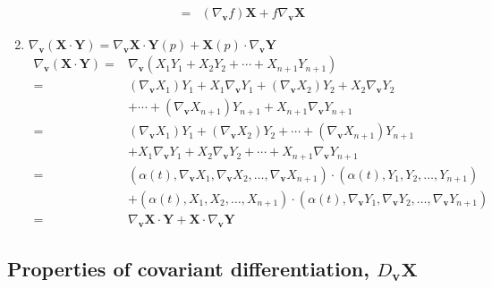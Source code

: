 \begin{enumerate}
\begin{align*}
		=& (\nabla_{\boldsymbol{v}} f)\boldsymbol{X} + f\nabla_{\boldsymbol{v}} \boldsymbol{X}
	\end{align*}
	\item $\nabla_{\boldsymbol{v}} (\boldsymbol{X} \cdot \boldsymbol{Y}) = \nabla_{\boldsymbol{v}} \boldsymbol{X} \cdot \boldsymbol{Y}(p) + \boldsymbol{X}(p) \cdot \nabla_{\boldsymbol{v}} \boldsymbol{Y} $
	\begin{align*}
		\nabla_{\boldsymbol{v}}(\boldsymbol{X} \cdot \boldsymbol{Y}) = & \nabla_{\boldsymbol{v}} (X_1Y_1 + X_2Y_2 + \dotsb + X_{n+1}Y_{n+1}) \\
		= & (\nabla_{\boldsymbol{v}} X_1)Y_1 + X_1\nabla_{\boldsymbol{v}} Y_1 + (\nabla_{\boldsymbol{v}} X_2) Y_2 + X_2\nabla_{\boldsymbol{v}} Y_2\\
		& + \dotsb + (\nabla_{\boldsymbol{v}} X_{n+1})Y_{n+1} + X_{n+1}\nabla_{\boldsymbol{v}} Y_{n+1}\\
		= & (\nabla_{\boldsymbol{v}} X_1)Y_1 + (\nabla_{\boldsymbol{v}} X_2)Y_2 + \dotsb + (\nabla_{\boldsymbol{v}} X_{n+1})Y_{n+1} \\
		& + X_1\nabla_{\boldsymbol{v}} Y_1 +X_2\nabla_{\boldsymbol{v}} Y_2 + \dotsb + X_{n+1} \nabla_{\boldsymbol{v}} Y_{n+1}\\
		= & (\alpha(t),\nabla_{\boldsymbol{v}} X_1,\nabla_{\boldsymbol{v}} X_2,\dots,\nabla_{\boldsymbol{v}} X_{n+1}) \cdot (\alpha(t),Y_1,Y_2,\dots,Y_{n+1})\\
		& + (\alpha(t),X_1,X_2,\dots,X_{n+1}) \cdot (\alpha(t),\nabla_{\boldsymbol{v}} Y_1,\nabla_{\boldsymbol{v}} Y_2,\dots,\nabla_{\boldsymbol{v}} Y_{n+1}) \\
		= & \nabla_{\boldsymbol{v}} \boldsymbol{X} \cdot \boldsymbol{Y} + \boldsymbol{X} \cdot \nabla_{\boldsymbol{v}} \boldsymbol{Y}
	\end{align*}
\end{enumerate}

\subsection{Properties of covariant differentiation, $D_{\boldsymbol{v}} \boldsymbol{X}$}


